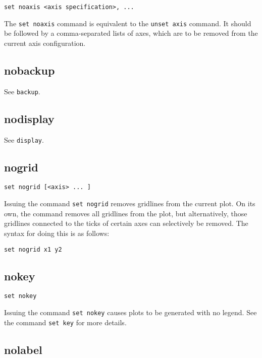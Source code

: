 \begin{verbatim}
set noaxis <axis specification>, ...
\end{verbatim}

The {\tt set noaxis} command is equivalent to the {\tt unset axis} command. It
should be followed by a comma-separated lists of axes, which are to be removed
from the current axis configuration.


\subsection{nobackup}

See {\tt backup}.


\subsection{nodisplay}

See {\tt display}.


\subsection{nogrid}

\begin{verbatim}
set nogrid [<axis> ... ]
\end{verbatim}

Issuing the command {\tt set nogrid} removes gridlines from the current plot. On
its own, the command removes all gridlines from the plot, but alternatively,
those gridlines connected to the ticks of certain axes can selectively be
removed.  The syntax for doing this is as follows:

\begin{verbatim}
set nogrid x1 y2
\end{verbatim}


\subsection{nokey}

\begin{verbatim}
set nokey
\end{verbatim}

Issuing the command {\tt set nokey} causes plots to be generated with no legend.
See the command {\tt set key} for more details.


\subsection{nolabel}

